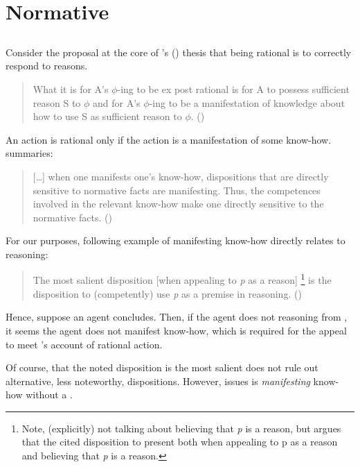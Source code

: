 \section{Normative}
\label{cha:lit:normative}

\subsection*{\textcite{Lord:2018aa}}

\begin{note}
  Consider the proposal at the core of \citeauthor{Lord:2018aa}'s (\citeyear{Lord:2018aa}) thesis that being rational is to correctly respond to reasons.

  \begin{quote}
    What it is for A's \(\phi\)-ing to be ex post rational is for A to possess sufficient reason S to \(\phi\) and for A's \(\phi\)-ing to be a manifestation of knowledge about how to use S as sufficient reason to \(\phi\).%
    \mbox{}\hfill\mbox{(\citeyear[143]{Lord:2018aa})}
  \end{quote}

  An \agents{} action is rational only if the action is a manifestation of some know-how.
  \citeauthor{Lord:2018aa} summaries:

  \begin{quote}
    [\dots] when one manifests one's know-how, dispositions that are directly sensitive to normative facts are manifesting. Thus, the competences involved in the relevant know-how make one directly sensitive to the normative facts.%
    \mbox{}\hfill\mbox{(\citeyear[16]{Lord:2018aa})}
  \end{quote}

  For our purposes, following example of manifesting know-how directly relates to reasoning:

  \begin{quote}
    The most salient disposition [when appealing to \emph{p} as a reason]%
    \footnote{
      Note, \citeauthor{Lord:2018aa} (explicitly) not talking about believing that \emph{p} is a reason, but argues that the cited disposition to present both when appealing to p as a reason and believing that \emph{p} is a reason.
    }
    is the disposition to (competently) use \emph{p} as a premise in reasoning.%
    \mbox{}\hfill\mbox{(\citeyear[25]{Lord:2018aa})}
  \end{quote}

  Hence, suppose an agent concludes.
  Then, if the agent does not \wit{} reasoning from \pool{}, it seems the agent does not manifest know-how, which is required for the appeal to meet \citeauthor{Lord:2018aa}'s account of rational action.

  Of course, that the noted disposition is the most salient does not rule out alternative, less noteworthy, dispositions.
  However, issues is \emph{manifesting} know-how without a \wit{}.
\end{note}


